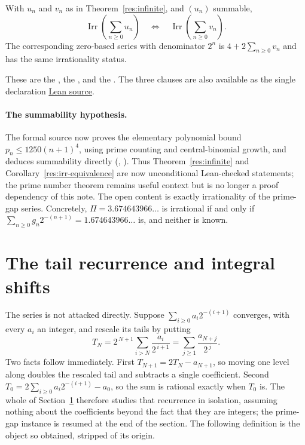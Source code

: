 \documentclass[11pt]{article}
\begin{document}
\begin{corollary}\label{res:irr-equivalence}
With $u_n$ and $v_n$ as in Theorem~\ref{res:infinite}, and $(u_n)$ summable,
\[
 \operatorname{Irr}\!\left(\sum_{n\ge0}u_n\right)
 \quad\Longleftrightarrow\quad
 \operatorname{Irr}\!\left(\sum_{n\ge0}v_n\right).
\]
The corresponding zero-based series with denominator $2^n$ is
$4+2\sum_{n\ge0}v_n$ and has the same irrationality status.
\end{corollary}

\noindent These are the
, the
, and the
.  The three clauses are also available as the single
declaration \href{https://github.com/wcook04/plectis-erdos/blob/f36a98bf3d3e6f65f1074e3b800e3293d5b8a51a/ErdosProblems/Erdos251/PaperCoreR7.lean#L56}{Lean source}.

\paragraph{The summability hypothesis.}
The formal source now proves the elementary polynomial bound
$p_n\le1250(n+1)^4$, using prime counting and central-binomial growth, and
deduces summability directly
(,
).
Thus Theorem~\ref{res:infinite} and Corollary~\ref{res:irr-equivalence} are now
unconditional Lean-checked statements; the prime number theorem remains useful
context but is no longer a proof dependency of this note.  The open content is
exactly irrationality of the prime-gap series.  Concretely,
$\Pi=3.674643966\ldots$ is irrational if and only if
$\sum_{n\ge0}g_n2^{-(n+1)}=1.674643966\ldots$ is, and neither is known.

\section{The tail recurrence and integral shifts}\label{sec:tail}

The series is not attacked directly.  Suppose $\sum_{i\ge0}a_i2^{-(i+1)}$
converges, with every $a_i$ an integer, and rescale its tails by putting
\[
 T_N=2^{\,N+1}\sum_{i>N}\frac{a_i}{2^{\,i+1}}
    =\sum_{j\ge1}\frac{a_{N+j}}{2^{\,j}} .
\]
Two facts follow immediately.  First $T_{N+1}=2T_N-a_{N+1}$, so moving one
level along doubles the rescaled tail and subtracts a single coefficient.
Second $T_0=2\sum_{i\ge0}a_i2^{-(i+1)}-a_0$, so the sum is rational exactly
when $T_0$ is.  The whole of Section~\ref{sec:tail} therefore studies that
recurrence in isolation, assuming nothing about the coefficients beyond the
fact that they are integers; the prime-gap instance is resumed at the end of
the section.  The following definition is the object so obtained, stripped of
its origin.
\end{document}
